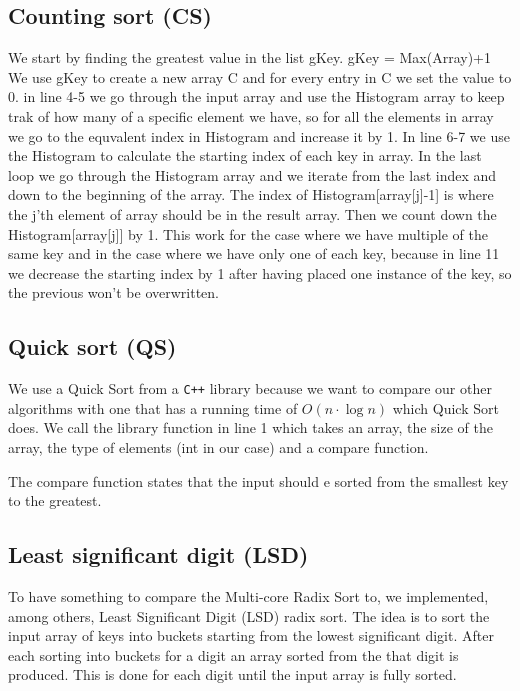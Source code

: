 \subsection{Counting sort (CS)}
We start by finding the greatest value in the list gKey.
gKey = Max(Array)+1
We use gKey to create a new array C and for every entry in C we set the value to 0.
in line 4-5 we go through the input array and use the Histogram array to keep trak of how many of a specific element we have, so for all the elements in array we go to the equvalent index in Histogram and increase it by 1.
In line 6-7 we use the Histogram to calculate the starting index of each key in array.
In the last loop we go through the Histogram array and we iterate from the last index and down to the beginning of the array.
The index of Histogram[array[j]-1] is where the j'th element of array should be in the result array.
Then we count down the Histogram[array[j]] by 1.
This work for the case where we have multiple of the same key and in the case where we have only one of each key, because in line 11 we decrease the starting index by 1 after having placed one instance of the key, so the previous won't be overwritten.



\subsection{Quick sort (QS)}
We use a Quick Sort from a \verb!C++! library because we want to compare our other algorithms with one that has a running time of $ O(n\cdot \log n) $ which Quick Sort does.
We call the library function in line 1 which takes an array, the size of the array, the type of elements (int in our case) and a compare function.

The compare function states that the input should e sorted from the smallest key to the greatest.



\subsection{Least significant digit (LSD)}
To have something to compare the Multi-core Radix Sort to, we implemented, among others, Least Significant Digit (LSD) radix sort. 
The idea is to sort the input array of keys into buckets starting from the lowest significant digit. After each sorting into buckets for a digit an array sorted from the that digit is produced. 
This is done for each digit until the input array is fully sorted. 

